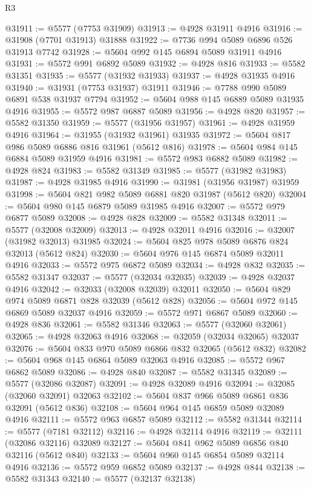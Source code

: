 \begin{lexlean}{R3}
\begin{coremodule}
@31911 := @5577 (@7753 @31909)
@31913 := @4928 @31911 @4916
@31916 := @31908 (@7701 @31913) @31888
@31922 := @7736 @994 @5089 @6896 @526 @31913 @7742
@31928 := @5604 @992 @145 @6894 @5089 @31911 @4916
@31931 := @5572 @991 @6892 @5089
@31932 := @4928 @816
@31933 := @5582 @31351
@31935 := @5577 (@31932 @31933)
@31937 := @4928 @31935 @4916
@31940 := @31931 (@7753 @31937) @31911
@31946 := @7788 @990 @5089 @6891 @538 @31937 @7794
@31952 := @5604 @988 @145 @6889 @5089 @31935 @4916
@31955 := @5572 @987 @6887 @5089
@31956 := @4928 @820
@31957 := @5582 @31350
@31959 := @5577 (@31956 @31957)
@31961 := @4928 @31959 @4916
@31964 := @31955 (@31932 @31961) @31935
@31972 := @5604 @817 @986 @5089 @6886 @816 @31961 (@5612 @816)
@31978 := @5604 @984 @145 @6884 @5089 @31959 @4916
@31981 := @5572 @983 @6882 @5089
@31982 := @4928 @824
@31983 := @5582 @31349
@31985 := @5577 (@31982 @31983)
@31987 := @4928 @31985 @4916
@31990 := @31981 (@31956 @31987) @31959
@31998 := @5604 @821 @982 @5089 @6881 @820 @31987 (@5612 @820)
@32004 := @5604 @980 @145 @6879 @5089 @31985 @4916
@32007 := @5572 @979 @6877 @5089
@32008 := @4928 @828
@32009 := @5582 @31348
@32011 := @5577 (@32008 @32009)
@32013 := @4928 @32011 @4916
@32016 := @32007 (@31982 @32013) @31985
@32024 := @5604 @825 @978 @5089 @6876 @824 @32013 (@5612 @824)
@32030 := @5604 @976 @145 @6874 @5089 @32011 @4916
@32033 := @5572 @975 @6872 @5089
@32034 := @4928 @832
@32035 := @5582 @31347
@32037 := @5577 (@32034 @32035)
@32039 := @4928 @32037 @4916
@32042 := @32033 (@32008 @32039) @32011
@32050 := @5604 @829 @974 @5089 @6871 @828 @32039 (@5612 @828)
@32056 := @5604 @972 @145 @6869 @5089 @32037 @4916
@32059 := @5572 @971 @6867 @5089
@32060 := @4928 @836
@32061 := @5582 @31346
@32063 := @5577 (@32060 @32061)
@32065 := @4928 @32063 @4916
@32068 := @32059 (@32034 @32065) @32037
@32076 := @5604 @833 @970 @5089 @6866 @832 @32065 (@5612 @832)
@32082 := @5604 @968 @145 @6864 @5089 @32063 @4916
@32085 := @5572 @967 @6862 @5089
@32086 := @4928 @840
@32087 := @5582 @31345
@32089 := @5577 (@32086 @32087)
@32091 := @4928 @32089 @4916
@32094 := @32085 (@32060 @32091) @32063
@32102 := @5604 @837 @966 @5089 @6861 @836 @32091 (@5612 @836)
@32108 := @5604 @964 @145 @6859 @5089 @32089 @4916
@32111 := @5572 @963 @6857 @5089
@32112 := @5582 @31344
@32114 := @5577 (@7181 @32112)
@32116 := @4928 @32114 @4916
@32119 := @32111 (@32086 @32116) @32089
@32127 := @5604 @841 @962 @5089 @6856 @840 @32116 (@5612 @840)
@32133 := @5604 @960 @145 @6854 @5089 @32114 @4916
@32136 := @5572 @959 @6852 @5089
@32137 := @4928 @844
@32138 := @5582 @31343
@32140 := @5577 (@32137 @32138)

\end{coremodule}
\end{lexlean}
